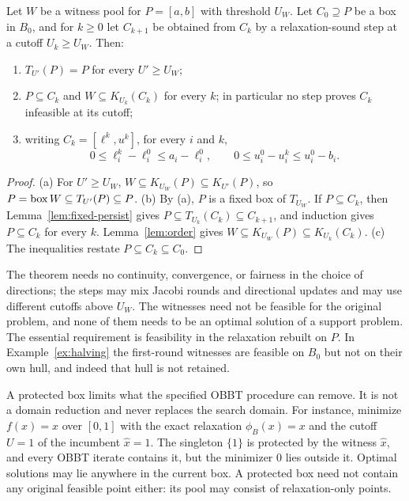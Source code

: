 \begin{theorem}[Protection]\label{thm:protected}
Let $W$ be a witness pool for $P=[a,b]$ with threshold $U_W$. Let
$C_0\supseteq P$ be a box in $B_0$, and for $k\ge0$ let $C_{k+1}$ be
obtained from $C_k$ by a relaxation-sound step at a cutoff $U_k\ge U_W$.
Then:
\begin{enumerate}[label=(\alph*)]
\item $T_{U'}(P)=P$ for every $U'\ge U_W$;
\item $P\subseteq C_k$ and $W\subseteq K_{U_k}(C_k)$ for every $k$; in
  particular no step proves $C_k$ infeasible at its cutoff;
\item writing $C_k=[\ell^k,u^k]$, for every $i$ and $k$,
\begin{equation}\label{eq:protected-ceilings}
 0\le\ell^k_i-\ell^0_i\le a_i-\ell^0_i,\qquad
 0\le u^0_i-u^k_i\le u^0_i-b_i.
\end{equation}
\end{enumerate}
\end{theorem}
\begin{proof}
(a) For $U'\ge U_W$, $W\subseteq K_{U_W}(P)\subseteq K_{U'}(P)$, so
$P=\operatorname{box} W\subseteq T_{U'}(P)\subseteq P$.
(b) By (a), $P$ is a fixed box of $T_{U_W}$. If $P\subseteq C_k$, then
Lemma~\ref{lem:fixed-persist} gives $P\subseteq T_{U_k}(C_k)\subseteq
C_{k+1}$, and induction gives $P\subseteq C_k$ for every $k$.
Lemma~\ref{lem:order} gives $W\subseteq K_{U_W}(P)\subseteq
K_{U_k}(C_k)$.
(c) The inequalities restate $P\subseteq C_k\subseteq C_0$.
\end{proof}

The theorem needs no continuity, convergence, or fairness in the choice of
directions; the steps may mix Jacobi rounds and directional updates and
may use different cutoffs above $U_W$. The witnesses need not be
feasible for the original problem, and none of them needs to be an
optimal solution of a support problem. The essential requirement is
feasibility in the relaxation rebuilt on $P$. In
Example~\ref{ex:halving} the first-round witnesses are feasible on $B_0$
but not on their own hull, and indeed that hull is not retained.

A protected box limits what the specified OBBT procedure can remove. It
is not a domain reduction and never replaces the search domain. For
instance, minimize $f(x)=x$ over $[0,1]$ with the exact relaxation
$\phi_B(x)=x$ and the cutoff $U=1$ of the incumbent $\hat x=1$. The
singleton $\{1\}$ is protected by the witness $\hat x$, and every OBBT
iterate contains it, but the minimizer $0$ lies outside it. Optimal
solutions may lie anywhere in the current box. A protected box need not
contain any original feasible point either: its pool may consist of
relaxation-only points.

